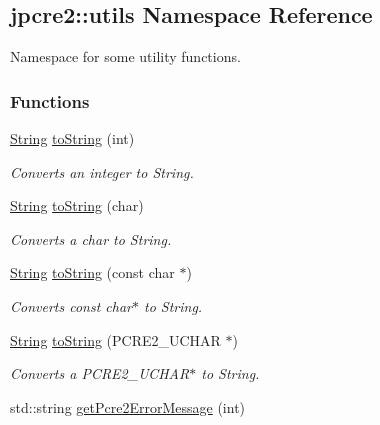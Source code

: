 \hypertarget{namespacejpcre2_1_1utils}{}\subsection{jpcre2\+:\+:utils Namespace Reference}
\label{namespacejpcre2_1_1utils}


Namespace for some utility functions.  


\subsubsection*{Functions}
\begin{DoxyCompactItemize}
\item 
\hyperlink{namespacejpcre2_a91f03070152fb228bc116c5a737f1d16}{String} \hyperlink{namespacejpcre2_1_1utils_a3603a3493202e7408e18fd0a912bf725}{to\+String} (int)
\begin{DoxyCompactList}\small\item\em Converts an integer to String. \end{DoxyCompactList}\item 
\hyperlink{namespacejpcre2_a91f03070152fb228bc116c5a737f1d16}{String} \hyperlink{namespacejpcre2_1_1utils_a917512161b56047d6ef240bdba2ac212}{to\+String} (char)
\begin{DoxyCompactList}\small\item\em Converts a char to String. \end{DoxyCompactList}\item 
\hyperlink{namespacejpcre2_a91f03070152fb228bc116c5a737f1d16}{String} \hyperlink{namespacejpcre2_1_1utils_a4065a2a40144999cd2a94e7a7e1d5eb6}{to\+String} (const char $\ast$)
\begin{DoxyCompactList}\small\item\em Converts const char$\ast$ to String. \end{DoxyCompactList}\item 
\hyperlink{namespacejpcre2_a91f03070152fb228bc116c5a737f1d16}{String} \hyperlink{namespacejpcre2_1_1utils_aea66a35f467adf41730c5a3bb21be6ed}{to\+String} (P\+C\+R\+E2\+\_\+\+U\+C\+H\+AR $\ast$)
\begin{DoxyCompactList}\small\item\em Converts a P\+C\+R\+E2\+\_\+\+U\+C\+H\+A\+R$\ast$ to String. \end{DoxyCompactList}\item 
std\+::string \hyperlink{namespacejpcre2_1_1utils_a6f28489b48095eeaacfaa43a0a8e87a6}{get\+Pcre2\+Error\+Message} (int)

\end{DoxyCompactItemize}
